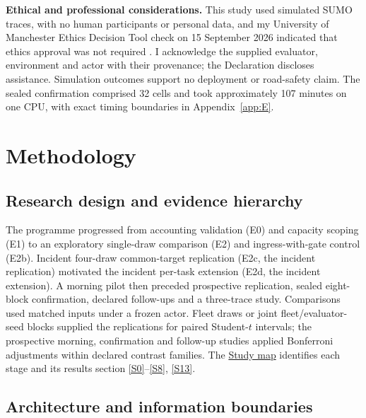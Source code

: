\documentclass[12pt,a4paper]{article}
\begin{document}
\textbf{Ethical and professional considerations.} This study used simulated SUMO traces, with no human participants or personal data, and my University of Manchester Ethics Decision Tool check on 15 September 2026 indicated that ethics approval was not required \cite{ref44}. I acknowledge the supplied evaluator, environment and actor with their provenance; the Declaration discloses assistance. Simulation outcomes support no deployment or road-safety claim. The sealed confirmation comprised 32 cells and took approximately 107 minutes on one CPU, with exact timing boundaries in Appendix~\ref{app:E}.

\FloatBarrier
\section{Methodology}\label{sec:2}

\FloatBarrier
\subsection{Research design and evidence hierarchy}\label{sec:2.1}

The programme progressed from accounting validation (E0) and capacity scoping (E1) to an exploratory single-draw comparison (E2) and ingress-with-gate control (E2b). Incident four-draw common-target replication (E2c, the incident replication) motivated the incident per-task extension (E2d, the incident extension). A morning pilot then preceded prospective replication, sealed eight-block confirmation, declared follow-ups and a three-trace study. Comparisons used matched inputs under a frozen actor. Fleet draws or joint fleet/evaluator-seed blocks supplied the replications for paired Student-$t$ intervals; the prospective morning, confirmation and follow-up studies applied Bonferroni adjustments within declared contrast families. The \hyperref[tab:study-map]{Study map} identifies each stage and its results section \hyperref[source-s0]{[S0]}--\hyperref[source-s8]{[S8]}, \hyperref[source-s13]{[S13]}.



\FloatBarrier
\subsection{Architecture and information boundaries}\label{sec:2.2}
\end{document}
